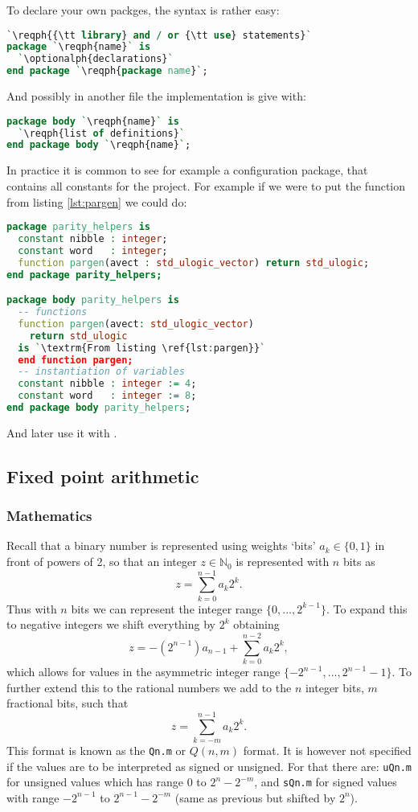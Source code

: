 \documentclass[margin=small]{tex/hsrzf}
\begin{document}
To declare your own packges, the syntax is rather easy:
\begin{lstlisting}[language = vhdl]
`\reqph{{\tt library} and / or {\tt use} statements}`
package `\reqph{name}` is
  `\optionalph{declarations}`
end package `\reqph{package name}`;
\end{lstlisting}
And possibly in another file the implementation is give with:
\begin{lstlisting}[language = vhdl]
package body `\reqph{name}` is
  `\reqph{list of definitions}`
end package body `\reqph{name}`;
\end{lstlisting}

In practice it is common to see for example a configuration package, that contains all constants for the project. For example if we were to put the function  from listing \ref{lst:pargen} we could do:
\begin{lstlisting}[language = vhdl]
package parity_helpers is
  constant nibble : integer;
  constant word   : integer;
  function pargen(avect : std_ulogic_vector) return std_ulogic;
end package parity_helpers;

package body parity_helpers is
  -- functions
  function pargen(avect: std_ulogic_vector)
    return std_ulogic
  is `\textrm{From listing \ref{lst:pargen}}`
  end function pargen;
  -- instantiation of variables
  constant nibble : integer := 4;
  constant word   : integer := 8;
end package body parity_helpers;
\end{lstlisting}
And later use it with .

\subsection{Fixed point arithmetic}

\subsubsection{Mathematics}

Recall that a binary number is represented using weights `bits' \(a_k \in \{ 0, 1 \}\) in front of powers of 2, so that an integer \(z \in \mathbb{N}_0\) is represented with \(n\) bits as
\[
  z = \sum_{k=0}^{n-1} a_k 2^k .
\]
Thus with \(n\) bits we can represent the integer range \(\{0,\ldots, 2^{k-1}\}\).
To expand this to negative integers we shift everything by \(2^k\) obtaining
\[
  z = -(2^{n-1}) a_{n-1} + \sum_{k=0}^{n-2} a_k 2^k,
\]
which allows for values in the asymmetric integer range \(\{-2^{n-1},\ldots, 2^{n-1} -1\}\). To further extend this to the rational numbers we add to the \(n\) integer bits, \(m\) fractional bits, such that
\[
  z = \sum_{k = -m}^{n - 1} a_k 2^k .
\]
This format is known as the \texttt{Qn.m} or \(Q(n,m)\) format. It is however not specified if the values are to be interpreted as signed or unsigned. For that there are: \texttt{uQn.m} for unsigned values which has range 0 to \(2^n - 2^{-m}\), and \texttt{sQn.m} for signed values with range \(-2^{n-1}\) to \(2^{n-1} - 2^{-m}\) (same as previous but shifted by \(2^n\)).
\end{document}
